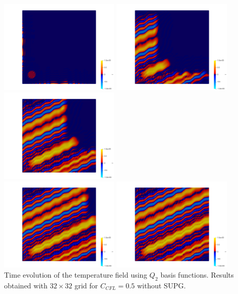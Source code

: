 \begin{center}
\includegraphics[width=5.7cm]{python_codes/fieldstone_43/results/experiment9/T.0000.png}
\includegraphics[width=5.7cm]{python_codes/fieldstone_43/results/experiment9/T.0010.png}
\includegraphics[width=5.7cm]{python_codes/fieldstone_43/results/experiment9/T.0020.png}\\
\includegraphics[width=5.7cm]{python_codes/fieldstone_43/results/experiment9/T.0030.png}
\includegraphics[width=5.7cm]{python_codes/fieldstone_43/results/experiment9/T.0040.png}\\
{\captionfont Time evolution of the 
temperature field using $Q_2$ basis functions. 
Results obtained with $32\times 32$ grid for $C_{CFL}=0.5$ without SUPG.}
\end{center}


